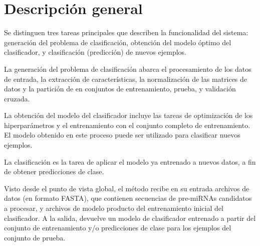 %
%
%
\section{Descripción general}
%
Se distinguen tres tareas principales que describen la funcionalidad
del sistema: generación del problema de clasificación, obtención del
modelo óptimo del clasificador, y clasificación (predicción) de nuevos
ejemplos.

La generación del problema de clasificación abarca el procesamiento de
los datos de entrada, la extracción de características, la
normalización de las matrices de datos y la partición de en conjuntos
de entrenamiento, prueba, y validación cruzada.

La obtención del modelo del clasificador incluye las tareas de
optimización de los hiperparámetros y el entrenamiento con el conjunto
completo de entrenamiento.  El modelo obtenido en este proceso puede
ser utilizado para clasificar nuevos ejemplos.

La clasificación es la tarea de aplicar el modelo ya entrenado a
nuevos datos, a fin de obtener predicciones de clase.

Visto desde el punto de vista global, el método recibe en su entrada
archivos de datos (en formato FASTA), que contienen secuencias de
pre-miRNAs candidatos a procesar, y archivos de modelo producto del
entrenamiento inicial del clasificador. A la salida, devuelve un
modelo de clasificador entrenado a partir del conjunto de
entrenamiento y/o predicciones de clase para los ejemplos del conjunto
de prueba.
